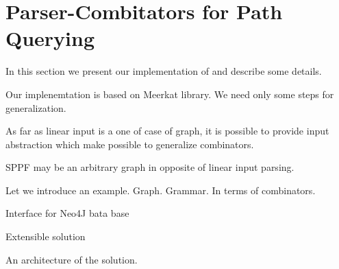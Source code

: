 \section{Parser-Combitators for Path Querying}

In this section we present our implementation of and describe some details.

Our implenemtation is based on Meerkat library. 
We need only some steps for generalization.

As far as linear input is a one of case of graph, it is possible to provide input abstraction which 
make possible to generalize combinators.

SPPF may be an arbitrary graph in opposite of linear input parsing.

Let we introduce an example. 
Graph.
Grammar.
In terms of combinators.


Interface for Neo4J bata base

Extensible solution

An architecture of the solution.
